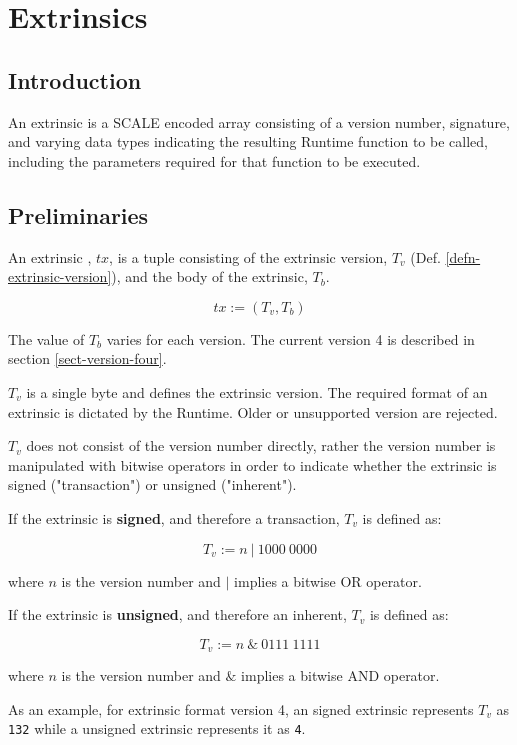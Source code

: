 \newpage
\chapter{Extrinsics}

\section{Introduction}

An extrinsic is a SCALE encoded array consisting of a version number,
signature, and varying data types indicating the resulting Runtime function to
be called, including the parameters required for that function to be executed.
\newline

\section{Preliminaries}

\begin{definition}
    An extrinsic , $tx$, is a tuple consisting of the extrinsic version,
    $T_v$ (Def. \ref{defn-extrinsic-version}), and the body of the extrinsic, $T_b$.

    \[
        tx := (T_v, T_b)
    \]

    The value of $T_b$ varies for each version. The current version 4 is
    described in section \ref{sect-version-four}.
\end{definition}

\begin{definition}
    \label{defn-extrinsic-version}
    $T_v$ is a single byte and defines the extrinsic version. The required
    format of an extrinsic is dictated by the Runtime. Older or unsupported
    version are rejected.
    \newline

    $T_v$ does not consist of the version number directly, rather the version
    number is manipulated with bitwise operators in order to indicate whether
    the extrinsic is signed ("transaction") or unsigned ("inherent").
    \newline

    If the extrinsic is \textbf{signed}, and therefore a transaction, $T_v$ is
    defined as:

    \[
        T_v := n \ | \ 1000 \ 0000
    \]

    where $n$ is the version number and $|$ implies a bitwise OR operator.
    \newline
    \newpage

    If the extrinsic is \textbf{unsigned}, and therefore an inherent, $T_v$ is
    defined as:

    \[
        T_v := n \ \& \ 0111 \ 1111
    \]

    where $n$ is the version number and $\&$ implies a bitwise AND operator.
    \newline

    As an example, for extrinsic format version 4, an signed extrinsic
    represents $T_v$ as \verb|132| while a unsigned extrinsic represents it as
    \verb|4|.
\end{definition}

